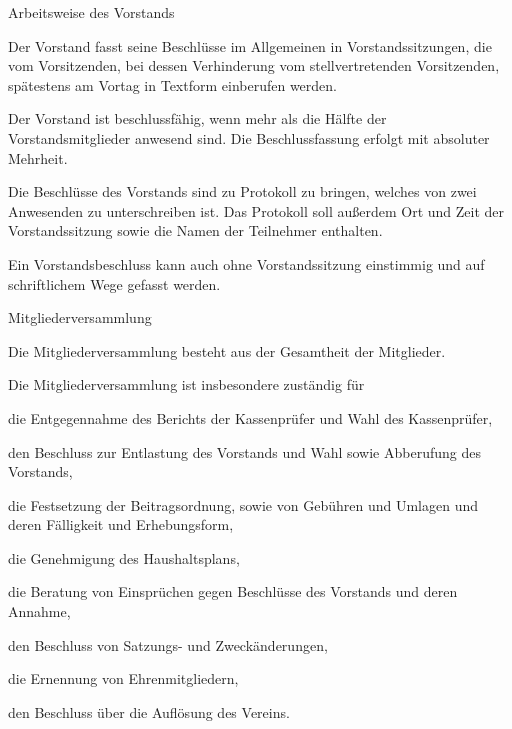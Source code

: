 \begin{para}{Arbeitsweise des Vorstands}
	\item Der Vorstand fasst seine Beschlüsse im Allgemeinen in Vorstandssitzungen, die vom Vorsitzenden, bei dessen Verhinderung vom stellvertretenden Vorsitzenden, spätestens am Vortag in Textform einberufen werden. 
	\item Der Vorstand ist beschlussfähig, wenn mehr als die Hälfte der Vorstandsmitglieder anwesend sind. Die Beschlussfassung erfolgt mit absoluter Mehrheit.
	\item Die Beschlüsse des Vorstands sind zu Protokoll zu bringen, welches von zwei Anwesenden zu unterschreiben ist. Das Protokoll soll außerdem Ort und Zeit der Vorstandssitzung sowie die Namen der Teilnehmer enthalten.
	\item Ein Vorstandsbeschluss kann auch ohne Vorstandssitzung einstimmig und auf schriftlichem Wege gefasst werden.
\end{para}

\begin{para}{Mitgliederversammlung}
	\item Die Mitgliederversammlung besteht aus der Gesamtheit der Mitglieder. 
	\item Die Mitgliederversammlung ist insbesondere zuständig für
	\begin{subpara}
		\item die Entgegennahme des Berichts der Kassenprüfer und Wahl des Kassenprüfer,
		\item den Beschluss zur Entlastung des Vorstands und Wahl sowie Abberufung des Vorstands,
		\item die Festsetzung der Beitragsordnung, sowie von Gebühren und Umlagen und deren Fälligkeit und Erhebungsform,
		\item die Genehmigung des Haushaltsplans,
		\item die Beratung von Einsprüchen gegen Beschlüsse des Vorstands und deren Annahme,
		\item den Beschluss von Satzungs- und Zweckänderungen,
		\item die Ernennung von Ehrenmitgliedern,
		\item den Beschluss über die Auflösung des Vereins.
	\end{subpara}
\end{para}

